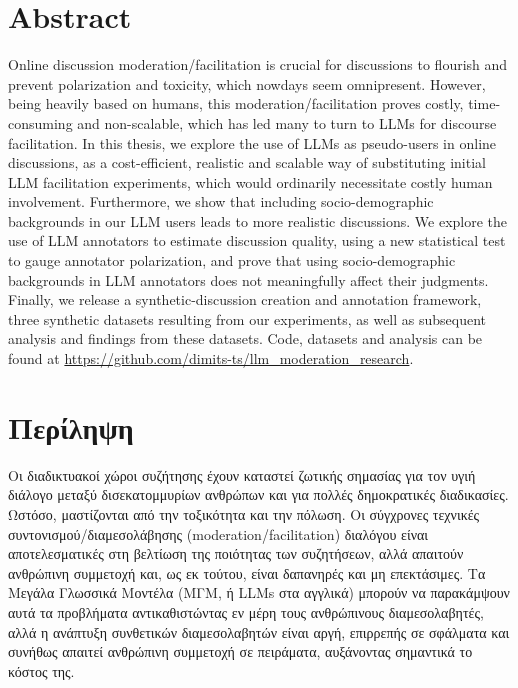 %

\let\cleardoublepage\clearpage

\chapter*{Abstract}
\label{sec:abstract}

Online discussion moderation/facilitation is crucial for discussions to flourish and prevent polarization and toxicity, which nowdays seem omnipresent. However, being heavily based on humans, this moderation/facilitation proves costly, time-consuming and non-scalable, which has led many to turn to LLMs for discourse facilitation. In this thesis, we explore the use of LLMs as pseudo-users in online discussions, as a cost-efficient, realistic and scalable way of substituting initial LLM facilitation experiments, which would ordinarily necessitate costly human involvement. Furthermore, we show that including socio-demographic backgrounds in our LLM users leads to more realistic discussions. We explore the use of LLM annotators to estimate discussion quality, using a new statistical test to gauge annotator polarization, and prove that using socio-demographic backgrounds in LLM annotators does not meaningfully affect their judgments. Finally, we release a synthetic-discussion creation and annotation framework, three synthetic datasets resulting from our experiments, as well as subsequent analysis and findings from these datasets. Code, datasets and analysis can be found at \url{https://github.com/dimits-ts/llm_moderation_research}.


\chapter*{Περίληψη}
\label{sec:abstract_greek}

Οι διαδικτυακοί χώροι συζήτησης έχουν καταστεί ζωτικής σημασίας για τον υγιή διάλογο μεταξύ δισεκατομμυρίων ανθρώπων και για πολλές δημοκρατικές διαδικασίες. Ωστόσο, μαστίζονται από την τοξικότητα και την πόλωση. Οι σύγχρονες τεχνικές συντονισμού/διαμεσολάβησης (moderation/facilitation) διαλόγου είναι αποτελεσματικές στη βελτίωση της ποιότητας των συζητήσεων, αλλά απαιτούν ανθρώπινη συμμετοχή και, ως εκ τούτου, είναι δαπανηρές και μη επεκτάσιμες. Τα Μεγάλα Γλωσσικά Μοντέλα (ΜΓΜ, ή LLMs στα αγγλικά) μπορούν να παρακάμψουν αυτά τα προβλήματα αντικαθιστώντας εν μέρη τους ανθρώπινους διαμεσολαβητές, αλλά η ανάπτυξη συνθετικών διαμεσολαβητών είναι αργή, επιρρεπής σε σφάλματα και συνήθως απαιτεί ανθρώπινη συμμετοχή σε πειράματα, αυξάνοντας σημαντικά το κόστος της. 

